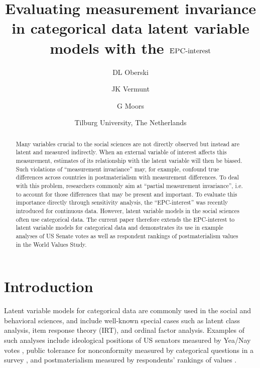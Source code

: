 \documentclass[letterpaper,12pt]{article}
\title{Evaluating measurement invariance in categorical data latent variable models with the  $\textrm{{\sc {EPC}}-interest}$}
\author{DL Oberski \and JK Vermunt \and G Moors}
\date{Tilburg University, The Netherlands}
\begin{document}
\maketitle



\begin{abstract}
Many variables crucial to the social sciences are not directly observed but instead are latent and measured indirectly. When an external variable of interest affects this measurement, estimates of its relationship with the latent variable will then be biased. Such violations of ``measurement invariance'' may, for example, confound true differences across countries in postmaterialism with measurement differences.
To deal with this problem, researchers commonly aim at ``partial measurement invariance'', i.e. to account for those differences that may be present and important. To evaluate this importance directly through sensitivity analysis, the ``EPC-interest''   was recently introduced  for continuous data. However, latent variable models in the social sciences often use categorical data. The current paper therefore extends the EPC-interest to latent variable models for categorical data and demonstrates its use in example analyses of US Senate votes as well as respondent rankings of postmaterialism values in the World Values Study. 
\end{abstract}





\section{Introduction}

\noindent
Latent variable models for categorical data are commonly used in the social and behavioral sciences, and include well-known special cases such as latent class analysis, item response theory (IRT), and ordinal factor analysis. Examples of such analyses include ideological positions of US senators measured by Yea/Nay votes \citep{poole1985spatial}, public tolerance for nonconformity measured by categorical questions in a survey \citep{mccutcheon1985latent}, and  postmaterialism  measured by respondents' rankings of values \citep{inglehart1977silent,moors2007heterogeneity}.
\end{document}
